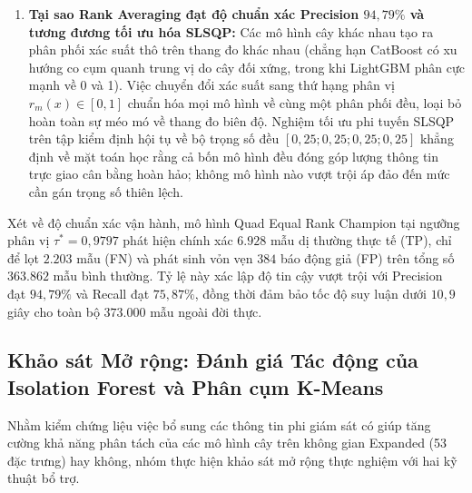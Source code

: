 \begin{enumerate}
\begin{itemize}
        \item Ngược lại, \textit{Quad Equal Prob Soft Voting} chỉ lấy trung bình cộng tuyến tính $\frac{1}{4}\sum p_i$, vốn rất dễ bị bóp méo nếu một mô hình cá lẻ xuất ra xác suất giả quá cao, khiến PR-AUC ($0{,}8436$) kém hơn hẳn.
    \end{itemize}
    \item \textbf{Tại sao Rank Averaging đạt độ chuẩn xác Precision $94{,}79\%$ và tương đương tối ưu hóa SLSQP:} Các mô hình cây khác nhau tạo ra phân phối xác suất thô trên thang đo khác nhau (chẳng hạn CatBoost có xu hướng co cụm quanh trung vị do cây đối xứng, trong khi LightGBM phân cực mạnh về 0 và 1). Việc chuyển đổi xác suất sang thứ hạng phân vị $r_m(x) \in [0, 1]$ chuẩn hóa mọi mô hình về cùng một phân phối đều, loại bỏ hoàn toàn sự méo mó về thang đo biên độ. Nghiệm tối ưu phi tuyến SLSQP trên tập kiểm định hội tụ về bộ trọng số đều $[0{,}25; 0{,}25; 0{,}25; 0{,}25]$ khẳng định về mặt toán học rằng cả bốn mô hình đều đóng góp lượng thông tin trực giao cân bằng hoàn hảo; không mô hình nào vượt trội áp đảo đến mức cần gán trọng số thiên lệch.
\end{enumerate}

Xét về độ chuẩn xác vận hành, mô hình Quad Equal Rank Champion tại ngưỡng phân vị $\tau^* = 0{,}9797$ phát hiện chính xác $6.928$ mẫu dị thường thực tế (TP), chỉ để lọt $2.203$ mẫu (FN) và phát sinh vỏn vẹn $384$ báo động giả (FP) trên tổng số $363.862$ mẫu bình thường. Tỷ lệ này xác lập độ tin cậy vượt trội với Precision đạt $94{,}79\%$ và Recall đạt $75{,}87\%$, đồng thời đảm bảo tốc độ suy luận dưới $10{,}9$ giây cho toàn bộ $373.000$ mẫu ngoài đời thực.

\subsection{Khảo sát Mở rộng: Đánh giá Tác động của Isolation Forest và Phân cụm K-Means}
\label{sec:iforest_kmeans_expanded}

Nhằm kiểm chứng liệu việc bổ sung các thông tin phi giám sát có giúp tăng cường khả năng phân tách của các mô hình cây trên không gian Expanded (53 đặc trưng) hay không, nhóm thực hiện khảo sát mở rộng thực nghiệm với hai kỹ thuật bổ trợ.

